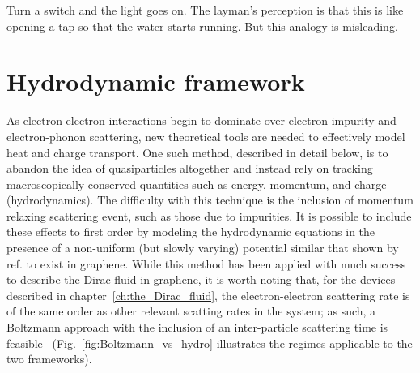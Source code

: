 \begin{savequote}[75mm]
Turn a switch and the light goes on. The layman's perception is that this is like opening a tap so that the water starts running. But this analogy is misleading.
\end{savequote}

\chapter{Hydrodynamic framework}
\label{Ch:hydrodynamic_framework}

As electron-electron interactions begin to dominate over electron-impurity and electron-phonon scattering, new theoretical tools are needed to effectively model heat and charge transport. One such method, described in detail below, is to abandon the idea of quasiparticles altogether and instead rely on tracking macroscopically conserved quantities such as energy, momentum, and charge (hydrodynamics). The difficulty with this technique is the inclusion of momentum relaxing scattering event, such as those due to impurities. It is possible to include these effects to first order by modeling the hydrodynamic equations in the presence of a non-uniform (but slowly varying) potential similar that shown by ref.\cite{xue_scanning_2011} to exist in graphene. While this method has been applied with much success to describe the Dirac fluid in graphene, it is worth noting that, for the devices described in chapter~\ref{ch:the_Dirac_fluid}, the electron-electron scattering rate is of the same order as other relevant scatting rates in the system; as such, a Boltzmann approach with the inclusion of an inter-particle scattering time is feasible~\cite{adam_theoretical_2017} (Fig.~\ref{fig:Boltzmann_vs_hydro} illustrates the regimes applicable to the two frameworks).


